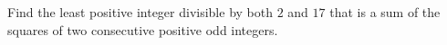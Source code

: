 Find the least positive integer divisible by both $2$ and $17$ that is a sum of the squares of two consecutive positive odd integers.
